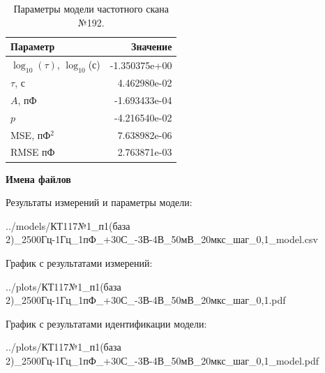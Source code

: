 \begin{table}[!ht]
    \centering
    \caption{Параметры модели частотного скана №192.}
    \begin{tabular}{|l|r|}
        \hline
        Параметр                                       & Значение                  \\ \hline
        $\log_{10}(\tau)$, $\log_{10}$(с)              & -1.350375e+00             \\ \hline
        $\tau$, с                                      & 4.462980e-02              \\ \hline
        $A$, пФ                                        & -1.693433e-04             \\ \hline
        $p$                                            & -4.216540e-02             \\ \hline
        MSE, пФ$^2$                                    & 7.638982e-06              \\ \hline
        RMSE пФ                                        & 2.763871e-03              \\ \hline
    \end{tabular}
    \label{table:frequency_scan_model_192}
\end{table}

\textbf{Имена файлов}

Результаты измерений и параметры модели:

\scriptsize../models/КТ117№1\_п1(база 2)\_2500Гц-1Гц\_1пФ\_+30С\_-3В-4В\_50мВ\_20мкс\_шаг\_0,1\_model.csv
\normalsize

График с результатами измерений:

\scriptsize../plots/КТ117№1\_п1(база 2)\_2500Гц-1Гц\_1пФ\_+30С\_-3В-4В\_50мВ\_20мкс\_шаг\_0,1.pdf
\normalsize

График с результатами идентификации модели:

\scriptsize../plots/КТ117№1\_п1(база 2)\_2500Гц-1Гц\_1пФ\_+30С\_-3В-4В\_50мВ\_20мкс\_шаг\_0,1\_model.pdf
\normalsize

